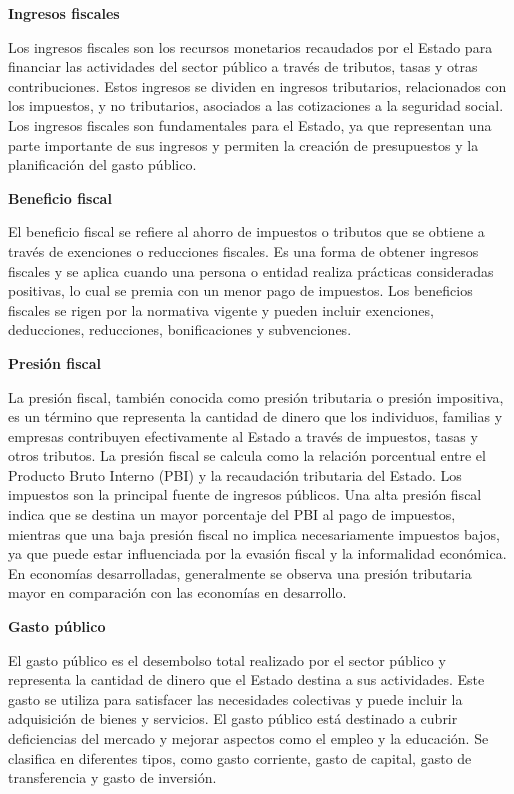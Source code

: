 \documentclass[
  letterpaper,
  DIV=11,
  numbers=noendperiod]{scrartcl}
\begin{document}
\textbf{Ingresos fiscales}

Los ingresos fiscales son los recursos monetarios recaudados por el
Estado para financiar las actividades del sector público a través de
tributos, tasas y otras contribuciones. Estos ingresos se dividen en
ingresos tributarios, relacionados con los impuestos, y no tributarios,
asociados a las cotizaciones a la seguridad social. Los ingresos
fiscales son fundamentales para el Estado, ya que representan una parte
importante de sus ingresos y permiten la creación de presupuestos y la
planificación del gasto público.

\textbf{Beneficio fiscal}

El beneficio fiscal se refiere al ahorro de impuestos o tributos que se
obtiene a través de exenciones o reducciones fiscales. Es una forma de
obtener ingresos fiscales y se aplica cuando una persona o entidad
realiza prácticas consideradas positivas, lo cual se premia con un menor
pago de impuestos. Los beneficios fiscales se rigen por la normativa
vigente y pueden incluir exenciones, deducciones, reducciones,
bonificaciones y subvenciones.

\textbf{Presión fiscal}

La presión fiscal, también conocida como presión tributaria o presión
impositiva, es un término que representa la cantidad de dinero que los
individuos, familias y empresas contribuyen efectivamente al Estado a
través de impuestos, tasas y otros tributos. La presión fiscal se
calcula como la relación porcentual entre el Producto Bruto Interno
(PBI) y la recaudación tributaria del Estado. Los impuestos son la
principal fuente de ingresos públicos. Una alta presión fiscal indica
que se destina un mayor porcentaje del PBI al pago de impuestos,
mientras que una baja presión fiscal no implica necesariamente impuestos
bajos, ya que puede estar influenciada por la evasión fiscal y la
informalidad económica. En economías desarrolladas, generalmente se
observa una presión tributaria mayor en comparación con las economías en
desarrollo.

\textbf{Gasto público}

El gasto público es el desembolso total realizado por el sector público
y representa la cantidad de dinero que el Estado destina a sus
actividades. Este gasto se utiliza para satisfacer las necesidades
colectivas y puede incluir la adquisición de bienes y servicios. El
gasto público está destinado a cubrir deficiencias del mercado y mejorar
aspectos como el empleo y la educación. Se clasifica en diferentes
tipos, como gasto corriente, gasto de capital, gasto de transferencia y
gasto de inversión.
\end{document}
